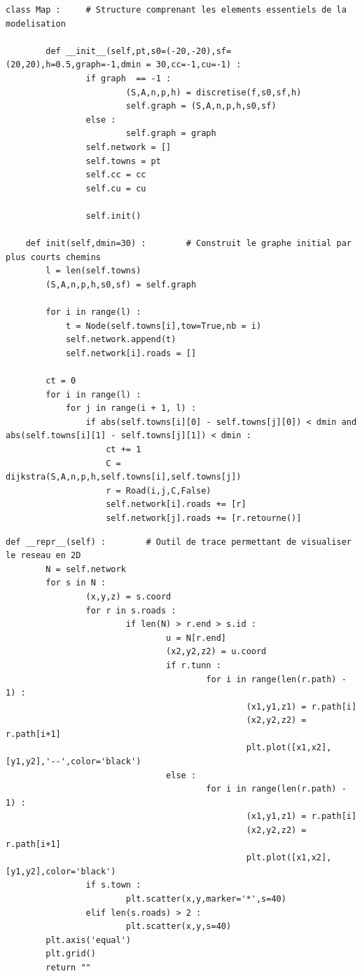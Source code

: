 \documentclass{beamer}[11pt]
\begin{document}
		\begin{frame}[containsverbatim]
\begin{lstlisting}[basicstyle=\tiny]
class Map :		# Structure comprenant les elements essentiels de la modelisation

		def __init__(self,pt,s0=(-20,-20),sf=(20,20),h=0.5,graph=-1,dmin = 30,cc=-1,cu=-1) :
				if graph  == -1 :
						(S,A,n,p,h) = discretise(f,s0,sf,h)
						self.graph = (S,A,n,p,h,s0,sf)
				else :
						self.graph = graph
				self.network = []
				self.towns = pt
				self.cc = cc
				self.cu = cu

				self.init()

    def init(self,dmin=30) :		# Construit le graphe initial par plus courts chemins
        l = len(self.towns)
        (S,A,n,p,h,s0,sf) = self.graph

        for i in range(l) :
            t = Node(self.towns[i],tow=True,nb = i)
            self.network.append(t)
            self.network[i].roads = []

        ct = 0
        for i in range(l) :
            for j in range(i + 1, l) :
                if abs(self.towns[i][0] - self.towns[j][0]) < dmin and abs(self.towns[i][1] - self.towns[j][1]) < dmin :
                    ct += 1
                    C = dijkstra(S,A,n,p,h,self.towns[i],self.towns[j])
                    r = Road(i,j,C,False)
                    self.network[i].roads += [r]
                    self.network[j].roads += [r.retourne()]
\end{lstlisting}
		\end{frame}

		\begin{frame}[containsverbatim]
\begin{lstlisting}
def __repr__(self) :		# Outil de trace permettant de visualiser le reseau en 2D
		N = self.network
		for s in N :
				(x,y,z) = s.coord
				for r in s.roads :
						if len(N) > r.end > s.id :
								u = N[r.end]
								(x2,y2,z2) = u.coord
								if r.tunn :
										for i in range(len(r.path) - 1) :
												(x1,y1,z1) = r.path[i]
												(x2,y2,z2) = r.path[i+1]
												plt.plot([x1,x2],[y1,y2],'--',color='black')
								else :
										for i in range(len(r.path) - 1) :
												(x1,y1,z1) = r.path[i]
												(x2,y2,z2) = r.path[i+1]
												plt.plot([x1,x2],[y1,y2],color='black')
				if s.town :
						plt.scatter(x,y,marker='*',s=40)
				elif len(s.roads) > 2 :
						plt.scatter(x,y,s=40)
		plt.axis('equal')
		plt.grid()
		return ""
\end{lstlisting}
		\end{frame}
\end{document}
